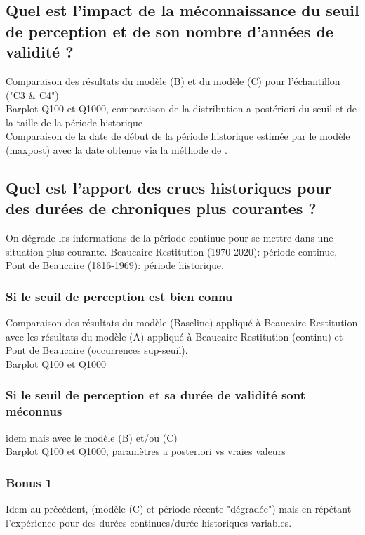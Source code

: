 \documentclass[11pt]{article}
\begin{document}
	\subsection{Quel est l'impact de la méconnaissance du seuil de perception et de son nombre d'années de validité ?}
	Comparaison des résultats du modèle (B) et du modèle (C) pour l'échantillon ("C3 \& C4")\\
	Barplot Q100 et Q1000, comparaison de la distribution a postériori du seuil et de la taille de la période historique\\
	Comparaison de la date de début de la période historique estimée par le modèle (maxpost) avec la date obtenue via la méthode de \cite{prosdocimi_german_2018}.\\

	\subsection{Quel est l'apport des crues historiques pour des durées de chroniques plus courantes ?}
	On dégrade les informations de la période continue pour se mettre dans une situation plus courante. Beaucaire Restitution (1970-2020): période continue, Pont de Beaucaire (1816-1969): période historique.
	\subsubsection{Si le seuil de perception est bien connu}
	Comparaison des résultats du modèle (Baseline) appliqué à Beaucaire Restitution avec les résultats du modèle (A) appliqué à Beaucaire Restitution (continu) et Pont de Beaucaire (occurrences sup-seuil).\\
	Barplot Q100 et Q1000
	
	\subsubsection{Si le seuil de perception et sa durée de validité sont méconnus}
	idem mais avec le modèle (B) et/ou (C)\\
	Barplot Q100 et Q1000, paramètres a posteriori vs vraies valeurs
	
	\subsubsection{Bonus 1}
	Idem au précédent, (modèle (C) et période récente "dégradée") mais en répétant l'expérience pour des durées continues/durée historiques variables. 
	
\end{document}
